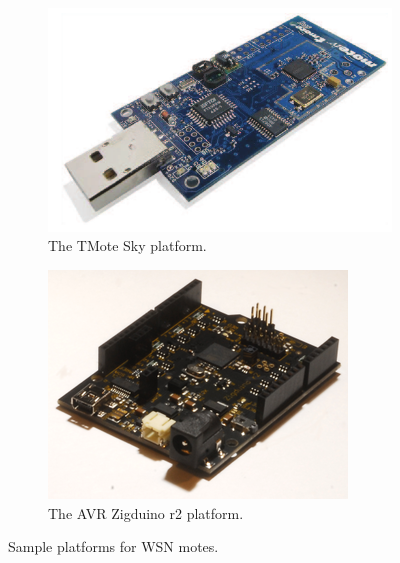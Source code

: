 \begin{figure}
	\centering
	\begin{subfigure}[b]{.5\textwidth}
		\centering
		\includegraphics[width=\textwidth]{images/tmote-sky.pdf}
		\caption{The TMote Sky platform.}
		\label{fig:intro:motes:sky}
	\end{subfigure}%
	\begin{subfigure}[b]{.5\textwidth}
		\centering
		\includegraphics[width=\textwidth]{images/zigduino-r2.png}
		\caption{The AVR Zigduino r2 platform.}
		\label{fig:intro:motes:zigduino}
	\end{subfigure}
	\caption{Sample platforms for WSN motes.}
	\label{fig:intro:motes}
\end{figure}


